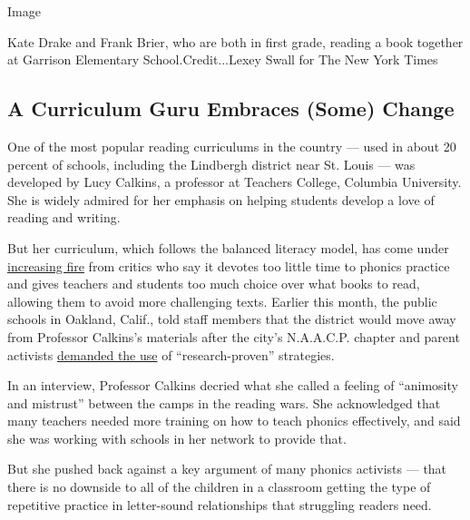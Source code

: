 Image

Kate Drake and Frank Brier, who are both in first grade, reading a book
together at Garrison Elementary School.Credit...Lexey Swall for The New
York Times

\hypertarget{a-curriculum-guru-embraces-some-change}{%
\subsection{A Curriculum Guru Embraces (Some)
Change}\label{a-curriculum-guru-embraces-some-change}}

One of the most popular reading curriculums in the country --- used in
about 20 percent of schools, including the Lindbergh district near St.
Louis --- was developed by Lucy Calkins, a professor at Teachers
College, Columbia University. She is widely admired for her emphasis on
helping students develop a love of reading and writing.

But her curriculum, which follows the balanced literacy model, has come
under
\href{https://achievethecore.org/page/3240/comparing-reading-research-to-program-design-an-examination-of-teachers-college-units-of-study}{increasing
fire} from critics who say it devotes too little time to phonics
practice and gives teachers and students too much choice over what books
to read, allowing them to avoid more challenging texts. Earlier this
month, the public schools in Oakland, Calif., told staff members that
the district would move away from Professor Calkins's materials after
the city's N.A.A.C.P. chapter and parent activists
\href{https://www.change.org/p/city-of-oakland-literacy-for-all-it-is-time-to-ensure-every-child-becomes-a-powerful-lifelong-reader?recruiter=1034689940\&recruited_by_id=81ef6730-38c3-11ea-8956-efb177e9a8f1\&utm_source=share_petition\&utm_medium=copylink\&utm_campaign=petition_dashboard\&use_react=false}{demanded
the use} of ``research-proven'' strategies.

In an interview, Professor Calkins decried what she called a feeling of
``animosity and mistrust'' between the camps in the reading wars. She
acknowledged that many teachers needed more training on how to teach
phonics effectively, and said she was working with schools in her
network to provide that.

But she pushed back against a key argument of many phonics activists ---
that there is no downside to all of the children in a classroom getting
the type of repetitive practice in letter-sound relationships that
struggling readers need.

